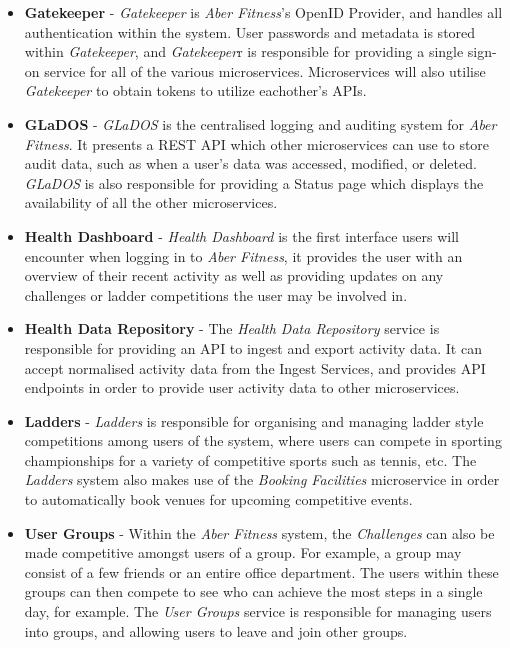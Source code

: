 \begin{itemize}
	\item \textbf{Gatekeeper} - \textit{Gatekeeper} is \textit{Aber Fitness}'s OpenID Provider, and handles all authentication within the system. User passwords and metadata is stored within \textit{Gatekeeper}, and \textit{Gatekeeper}r is responsible for providing a single sign-on service for all of the various microservices. Microservices will also utilise \textit{Gatekeeper} to obtain tokens to utilize eachother's APIs.

	\item \textbf{GLaDOS} - \textit{GLaDOS} is the centralised logging and auditing system for \textit{Aber Fitness}. It presents a REST API which other microservices can use to store audit data, such as when a user's data was accessed, modified, or deleted. \textit{GLaDOS} is also responsible for providing a Status page which displays the availability of all the other microservices.

	\item \textbf{Health Dashboard} - \textit{Health Dashboard} is the first interface users will encounter when logging in to \textit{Aber Fitness}, it provides the user with an overview of their recent activity as well as providing updates on any challenges or ladder competitions the user may be involved in.

	\item \textbf{Health Data Repository} - The \textit{Health Data Repository} service is responsible for providing an API to ingest and export activity data. It can accept normalised activity data from the Ingest Services, and provides API endpoints in order to provide user activity data to other microservices. 

	\item \textbf{Ladders} - \textit{Ladders} is responsible for organising and managing ladder style competitions among users of the system, where users can compete in sporting championships for a variety of competitive sports such as tennis, etc. The \textit{Ladders} system also makes use of the \textit{Booking Facilities} microservice in order to automatically book venues for upcoming competitive events.

	\item \textbf{User Groups} - Within the \textit{Aber Fitness} system, the \textit{Challenges} can also be made competitive amongst users of a group. For example, a group may consist of a few friends or an entire office department. The users within these groups can then compete to see who can achieve the most steps in a single day, for example. The \textit{User Groups} service is responsible for managing users into groups, and allowing users to leave and join other groups.

\end{itemize}